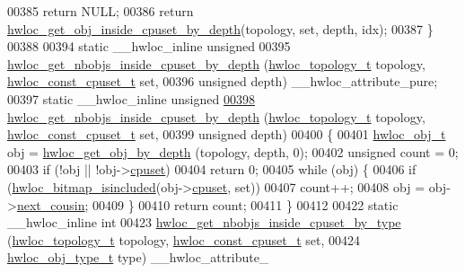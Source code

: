 \begin{DoxyCode}
00385     \textcolor{keywordflow}{return} NULL;
00386   \textcolor{keywordflow}{return} \hyperlink{a00054_ga57c8a0e227d1b16a31d19aaf755b42c0}{hwloc_get_obj_inside_cpuset_by_depth}(topology, \textcolor{keyword}{set}, depth, idx);
00387 \}
00388 
00394 \textcolor{keyword}{static} \_\_hwloc\_inline \textcolor{keywordtype}{unsigned}
00395 \hyperlink{a00054_ga457604a2dedbf70ba3b480558666b56b}{hwloc_get_nbobjs_inside_cpuset_by_depth} (\hyperlink{a00039_ga9d1e76ee15a7dee158b786c30b6a6e38}{hwloc_topology_t} topology, 
      \hyperlink{a00040_ga1f784433e9b606261f62d1134f6a3b25}{hwloc_const_cpuset_t} \textcolor{keyword}{set},
00396                                          \textcolor{keywordtype}{unsigned} depth) \_\_hwloc\_attribute\_pure;
00397 \textcolor{keyword}{static} \_\_hwloc\_inline \textcolor{keywordtype}{unsigned}
\hypertarget{a00031_source_l00398}{}\hyperlink{a00054_ga457604a2dedbf70ba3b480558666b56b}{00398} \hyperlink{a00054_ga457604a2dedbf70ba3b480558666b56b}{hwloc_get_nbobjs_inside_cpuset_by_depth} (\hyperlink{a00039_ga9d1e76ee15a7dee158b786c30b6a6e38}{hwloc_topology_t} topology, 
      \hyperlink{a00040_ga1f784433e9b606261f62d1134f6a3b25}{hwloc_const_cpuset_t} \textcolor{keyword}{set},
00399                                          \textcolor{keywordtype}{unsigned} depth)
00400 \{
00401   \hyperlink{a00016}{hwloc_obj_t} obj = \hyperlink{a00047_gaedd78240b0c1108355586a268ec5a697}{hwloc_get_obj_by_depth} (topology, depth, 0);
00402   \textcolor{keywordtype}{unsigned} count = 0;
00403   \textcolor{keywordflow}{if} (!obj || !obj->\hyperlink{a00016_a67925e0f2c47f50408fbdb9bddd0790f}{cpuset})
00404     \textcolor{keywordflow}{return} 0;
00405   \textcolor{keywordflow}{while} (obj) \{
00406     \textcolor{keywordflow}{if} (\hyperlink{a00065_gaae29e14a926c198e8f91e6e4790621e7}{hwloc_bitmap_isincluded}(obj->\hyperlink{a00016_a67925e0f2c47f50408fbdb9bddd0790f}{cpuset}, \textcolor{keyword}{set}))
00407       count++;
00408     obj = obj->\hyperlink{a00016_a85a788017457129589318b6c39451acf}{next_cousin};
00409   \}
00410   \textcolor{keywordflow}{return} count;
00411 \}
00412 
00422 \textcolor{keyword}{static} \_\_hwloc\_inline \textcolor{keywordtype}{int}
00423 \hyperlink{a00054_ga63481874c69ed257b1a0c03e7615ff97}{hwloc_get_nbobjs_inside_cpuset_by_type} (\hyperlink{a00039_ga9d1e76ee15a7dee158b786c30b6a6e38}{hwloc_topology_t} topology, 
      \hyperlink{a00040_ga1f784433e9b606261f62d1134f6a3b25}{hwloc_const_cpuset_t} \textcolor{keyword}{set},
00424                                         \hyperlink{a00041_gacd37bb612667dc437d66bfb175a8dc55}{hwloc_obj_type_t} type) \_\_hwloc\_attribute\_

\end{DoxyCode}
